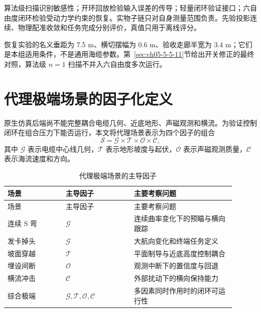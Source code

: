 算法级扫描识别敏感性；开环回放检验输入误差的传导；轻量闭环验证接口；六自由度闭环检验受动力学约束的恢复。实物子链只对自身测量范围负责。先验投影连续、物理配准收敛和任务完成分别评价，真值只用于离线评分。

恢复实验的名义垂距为 7.5 m、横切摆幅为 0.6 m、验收走廊半宽为 3.4 m；它们是本组适用条件，不是通用海缆参数。第~\ref{sec:ch05-5-5-11}节给出开关修正的最终对照，算法级 $n=1$ 扫描不并入六自由度多次运行。

\section{代理极端场景的因子化定义}\label{sec:app-a-10}

原生仿真后端尚不能完整耦合电缆几何、近底地形、声磁观测和横流。为验证控制闭环在组合压力下能否运行，本文将代理场景表示为四个因子的组合
\begin{equation}
  \mathcal{S}
  =
  \mathcal{G}
  \times
  \mathcal{T}
  \times
  \mathcal{O}
  \times
  \mathcal{C},
  \label{eq:app-proxy-factorization}
\end{equation}
其中 \(\mathcal{G}\) 表示电缆中心线几何，\(\mathcal{T}\) 表示地形坡度与起伏，\(\mathcal{O}\) 表示声磁观测质量，\(\mathcal{C}\) 表示海流速度和方向。

\begingroup
\small
\setlength{\tabcolsep}{3pt}
\renewcommand{\arraystretch}{1.04}
\begin{longtable}{@{}>{\raggedright\arraybackslash}p{0.23\linewidth}>{\raggedright\arraybackslash}p{0.27\linewidth}>{\raggedright\arraybackslash}p{0.40\linewidth}@{}}
\caption{代理极端场景的主导因子}\label{tab:app-a-proxy-scenarios}\\
\toprule
场景 & 主导因子 & 主要考察问题 \\
\midrule
\endfirsthead
\toprule
场景 & 主导因子 & 主要考察问题 \\
\midrule
\endhead
\bottomrule
\endfoot
连续 S 弯 & \(\mathcal{G}\) & 连续曲率变化下的预瞄与横向跟踪 \\
发卡掉头 & \(\mathcal{G}\) & 大航向变化和终端任务定义 \\
坡面穿越 & \(\mathcal{T}\) & 平面制导与近底高度控制耦合 \\
埋设间断 & \(\mathcal{O}\) & 观测中断下的置信度与回退 \\
横流冲击 & \(\mathcal{C}\) & 外部扰动下的横向保持能力 \\
综合极端 & \(\mathcal{G},\mathcal{T},\mathcal{O},\mathcal{C}\) & 多因素同时作用时的闭环可运行性 \\
\end{longtable}
\endgroup


